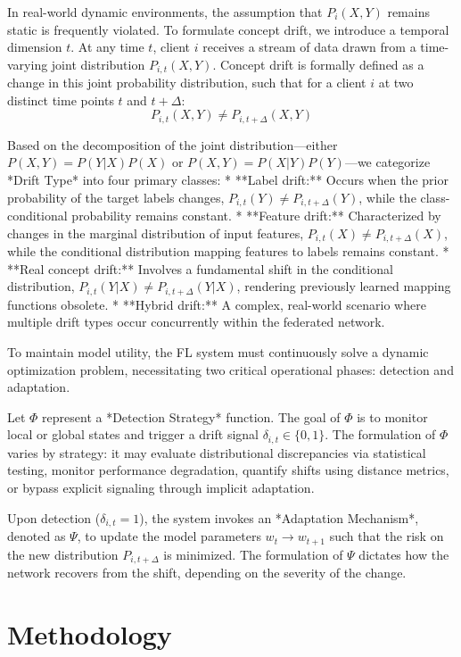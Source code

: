 \documentclass[journal]{IEEEtran}
\begin{document}
In real-world dynamic environments, the assumption that $P_i(X, Y)$ remains static is frequently violated. To formulate concept drift, we introduce a temporal dimension $t$. At any time $t$, client $i$ receives a stream of data drawn from a time-varying joint distribution $P_{i,t}(X, Y)$. Concept drift is formally defined as a change in this joint probability distribution, such that for a client $i$ at two distinct time points $t$ and $t+\Delta$:
$$ P_{i,t}(X, Y) \neq P_{i,t+\Delta}(X, Y) $$

Based on the decomposition of the joint distribution—either $P(X, Y) = P(Y|X)P(X)$ or $P(X, Y) = P(X|Y)P(Y)$—we categorize *Drift Type* into four primary classes:
*   **Label drift:** Occurs when the prior probability of the target labels changes, $P_{i,t}(Y) \neq P_{i,t+\Delta}(Y)$, while the class-conditional probability remains constant.
*   **Feature drift:** Characterized by changes in the marginal distribution of input features, $P_{i,t}(X) \neq P_{i,t+\Delta}(X)$, while the conditional distribution mapping features to labels remains constant.
*   **Real concept drift:** Involves a fundamental shift in the conditional distribution, $P_{i,t}(Y|X) \neq P_{i,t+\Delta}(Y|X)$, rendering previously learned mapping functions obsolete.
*   **Hybrid drift:** A complex, real-world scenario where multiple drift types occur concurrently within the federated network.

To maintain model utility, the FL system must continuously solve a dynamic optimization problem, necessitating two critical operational phases: detection and adaptation.

Let $\Phi$ represent a *Detection Strategy* function. The goal of $\Phi$ is to monitor local or global states and trigger a drift signal $\delta_{i,t} \in \{0, 1\}$. The formulation of $\Phi$ varies by strategy: it may evaluate distributional discrepancies via statistical testing, monitor performance degradation, quantify shifts using distance metrics, or bypass explicit signaling through implicit adaptation.

Upon detection ($\delta_{i,t} = 1$), the system invokes an *Adaptation Mechanism*, denoted as $\Psi$, to update the model parameters $w_t \rightarrow w_{t+1}$ such that the risk on the new distribution $P_{i, t+\Delta}$ is minimized. The formulation of $\Psi$ dictates how the network recovers from the shift, depending on the severity of the change.

\section{Methodology}
\label{sec:methodology}
\end{document}
